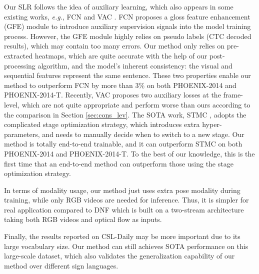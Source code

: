 \documentclass[acmsmall,screen]{acmart}
\def\eg{\emph{e.g.}} \def\Eg{\emph{E.g.}}
\begin{document}
Our SLR follows the idea of auxiliary learning, which also appears in some existing works, \eg, FCN \cite{fcn} and VAC \cite{vac}.
FCN proposes a gloss feature enhancement (GFE) module to introduce auxiliary supervision signals into the model training process.
However, the GFE module highly relies on pseudo labels (CTC decoded results), which may contain too many errors.
Our method only relies on pre-extracted heatmaps, which are quite accurate with the help of our post-processing algorithm, and the model's inherent consistency: the visual and sequential features represent the same sentence.
These two properties enable our method to outperform FCN by more than 3\% on both PHOENIX-2014 and PHOENIX-2014-T.
Recently, VAC proposes two auxiliary losses at the frame-level, which are not quite appropriate and perform worse than ours according to the comparison in Section \ref{sec:cons_lev}.
The SOTA work, STMC \cite{stmc}, adopts the complicated stage optimization strategy, which introduces extra hyper-parameters, and needs to manually decide when to switch to a new stage.
Our method is totally end-to-end trainable, and it can outperform STMC on both PHOENIX-2014 and PHOENIX-2014-T.
To the best of our knowledge, this is the first time that an end-to-end method can outperform those using the stage optimization strategy.

In terms of modality usage, our method just uses extra pose modality during training, while only RGB videos are needed for inference.
Thus, it is simpler for real application compared to DNF \cite{dnf} which is built on a two-stream architecture taking both RGB videos and optical flow as inputs.

Finally, the results reported on CSL-Daily may be more important due to its large vocabulary size.
Our method can still achieves SOTA performance on this large-scale dataset, which also validates the generalization capability of our method over different sign languages.
\end{document}
